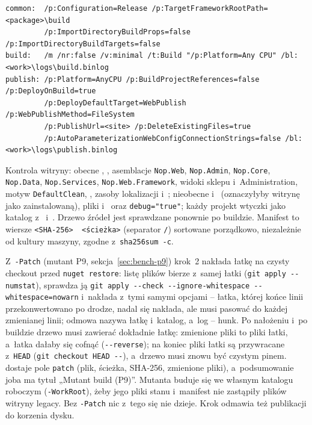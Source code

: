 \begin{lstlisting}
common:  /p:Configuration=Release /p:TargetFrameworkRootPath=<package>\build
         /p:ImportDirectoryBuildProps=false /p:ImportDirectoryBuildTargets=false
build:   /m /nr:false /v:minimal /t:Build "/p:Platform=Any CPU" /bl:<work>\logs\build.binlog
publish: /p:Platform=AnyCPU /p:BuildProjectReferences=false /p:DeployOnBuild=true
         /p:DeployDefaultTarget=WebPublish /p:WebPublishMethod=FileSystem
         /p:PublishUrl=<site> /p:DeleteExistingFiles=true
         /p:AutoParameterizationWebConfigConnectionStrings=false /bl:<work>\logs\publish.binlog
\end{lstlisting}

Kontrola witryny: obecne , , asemblacje
\texttt{Nop.Web}, \texttt{Nop.Admin}, \texttt{Nop.Core}, \texttt{Nop.Data},
\texttt{Nop.Services}, \texttt{Nop.Web.Framework}, widoki sklepu i~Administration,
motyw \texttt{DefaultClean}, ,
zasoby lokalizacji i~; nieobecne 
i~ (oznaczyłyby witrynę jako zainstalowaną), pliki
 i~ oraz \texttt{debug="true"}; każdy projekt wtyczki jako katalog
z~ i~. Drzewo źródeł jest sprawdzane
ponownie po buildzie. Manifest to wiersze \texttt{<SHA-256>~~<ścieżka>} (separator
\texttt{/}) sortowane porządkowo, niezależnie od kultury maszyny, zgodne z~\texttt{sha256sum
-c}.

Z~\texttt{-Patch} (mutant P9, sekcja~\ref{sec:bench-p9}) krok~2 nakłada łatkę na czysty
checkout przed \texttt{nuget restore}: listę plików bierze z~samej łatki
(\texttt{git apply -{}-numstat}), sprawdza ją \texttt{git apply -{}-check -{}-ignore-whitespace
-{}-whitespace=nowarn} i~nakłada z~tymi samymi opcjami -- łatka, której końce linii
przekonwertowano po drodze, nadal się nakłada, ale musi pasować do każdej zmienianej linii;
odmowa nazywa łatkę i~katalog, a~log -- hunk. Po nałożeniu i~po buildzie drzewo musi zawierać
dokładnie łatkę: zmienione pliki to pliki łatki, a~łatka dałaby się cofnąć
(\texttt{-{}-reverse}); na koniec pliki łatki są przywracane z~\texttt{HEAD}
(\texttt{git checkout HEAD -{}-}), a~drzewo musi znowu być czystym pinem. 
dostaje pole \texttt{patch} (plik, ścieżka, SHA-256, zmienione pliki), a~podsumowanie joba ma
tytuł „Mutant build (P9)”. Mutanta buduje się we własnym katalogu roboczym
(\texttt{-WorkRoot}), żeby jego pliki stanu i~manifest nie zastąpiły plików witryny legacy. Bez
\texttt{-Patch} nic z~tego się nie dzieje. Krok odmawia też publikacji do korzenia dysku.


